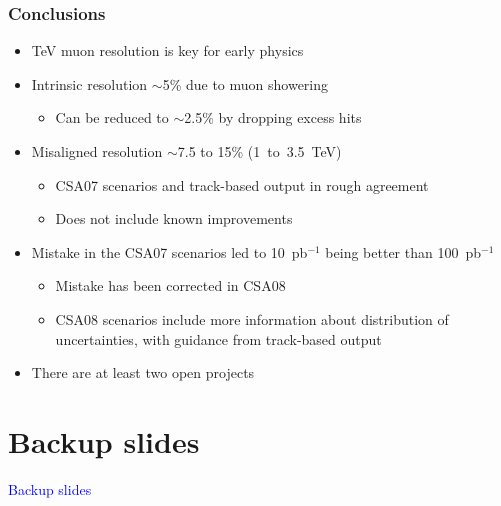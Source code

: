 \documentclass[compress]{beamer}
\begin{document}
\begin{frame}
\frametitle{Conclusions}
\begin{itemize}\setlength{\itemsep}{0.35 cm}
\item TeV muon resolution is key for early physics

\item Intrinsic resolution $\sim$5\% due to muon showering

\begin{itemize}
\item Can be reduced to $\sim$2.5\% by dropping excess hits
\end{itemize}

\item Misaligned resolution $\sim$7.5 to 15\% \mbox{(1 to 3.5~TeV) \hspace{-1 cm}}

\begin{itemize}\setlength{\itemsep}{0.1 cm}
\item CSA07 scenarios and track-based output in rough agreement
\item Does not include known improvements
\end{itemize}

\item Mistake in the CSA07 scenarios led to 10~pb$^{-1}$ being better
than 100~pb$^{-1}$

\begin{itemize}\setlength{\itemsep}{0.1 cm}
\item Mistake has been corrected in CSA08
\item CSA08 scenarios include more information about distribution of
uncertainties, with guidance from track-based output
\end{itemize}

\item There are at least two open projects

\end{itemize}
\label{numpages}
\end{frame}

\section*{Backup slides}
\begin{frame}
\begin{center}
\Huge \textcolor{blue}{Backup slides}
\end{center}
\end{frame}
\end{document}
